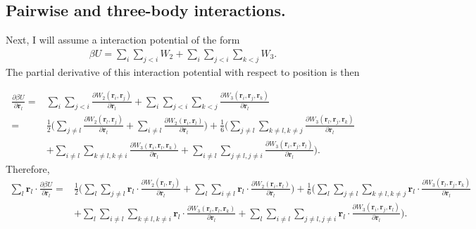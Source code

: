 \documentclass[twocolumn,amsmath,amssymb,aps]{revtex4-1}%
\begin{document}
\subsection{Pairwise and three-body interactions.\label{app:onlytwobody}}

Next, I will assume a interaction potential of the form
\begin{align}
  \beta U = \sum_{i}\sum_{j<i}W_2+\sum_{i}\sum_{j<i}\sum_{k<j}W_3.
\end{align}
The partial derivative of this interaction potential with respect
to position is then
\begin{widetext}
  \begin{align}
    \frac{\partial \beta U}{\partial \bm{r}_l}
    =& \sum_{i}\sum_{j<i}
    \frac{\partial W_2(\bm{r}_i,\bm{r}_j)}{\partial \bm{r}_l}
    +\sum_{i}\sum_{j<i}\sum_{k<j}
    \frac{\partial W_3(\bm{r}_i,\bm{r}_j,\bm{r}_k)}{\partial \bm{r}_l}
    \nonumber\\
    =& \frac{1}{2}\bigg(\sum_{j\neq l}
    \frac{\partial W_2(\bm{r}_l,\bm{r}_j)}{\partial \bm{r}_l}
    +\sum_{i\neq l}
    \frac{\partial W_2(\bm{r}_i,\bm{r}_l)}{\partial \bm{r}_l}\bigg)
    +\frac{1}{6}\bigg(\sum_{j\neq l}\sum_{k\neq l,k\neq j}
    \frac{\partial W_3(\bm{r}_l,\bm{r}_j,\bm{r}_k)}{\partial \bm{r}_l}
    \nonumber\\
    &+\sum_{i\neq l}\sum_{k\neq l, k\neq i}
    \frac{\partial W_3(\bm{r}_i,\bm{r}_l,\bm{r}_k)}{\partial \bm{r}_l}
    +\sum_{i\neq l}\sum_{j\neq l,j\neq i}
    \frac{\partial W_3(\bm{r}_i,\bm{r}_j,\bm{r}_l)}{\partial \bm{r}_l}
    \bigg).
  \end{align}
  Therefore,
  \begin{align}
    \sum_l\bm{r}_l\cdot\frac{\partial \beta U}{\partial \bm{r}_l}
    =&\frac{1}{2}\bigg(\sum_l\sum_{j\neq l}\bm{r}_l\cdot
    \frac{\partial W_2(\bm{r}_l,\bm{r}_j)}{\partial \bm{r}_l}
    +\sum_l\sum_{i\neq l}\bm{r}_l\cdot
    \frac{\partial W_2(\bm{r}_i,\bm{r}_l)}{\partial \bm{r}_l}\bigg)
    +\frac{1}{6}\bigg(\sum_l\sum_{j\neq l}\sum_{k\neq l,k\neq j}
    \bm{r}_l\cdot
    \frac{\partial W_3(\bm{r}_l,\bm{r}_j,\bm{r}_k)}{\partial \bm{r}_l}
    \nonumber\\
    &+\sum_l\sum_{i\neq l}\sum_{k\neq l, k\neq i}\bm{r}_l\cdot
    \frac{\partial W_3(\bm{r}_i,\bm{r}_l,\bm{r}_k)}{\partial \bm{r}_l}
    +\sum_l\sum_{i\neq l}\sum_{j\neq l,j\neq i}\bm{r}_l\cdot
    \frac{\partial W_3(\bm{r}_i,\bm{r}_j,\bm{r}_l)}{\partial \bm{r}_l}
    \bigg).
  \end{align}
\end{widetext}
\end{document}
